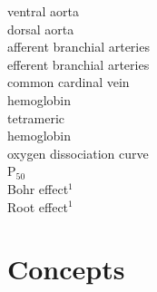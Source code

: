 \documentclass[nofonts, letterpaper]{tufte-handout}
\begin{document}
\begin{multicols}{2}
ventral aorta \\
dorsal aorta \\
afferent branchial arteries \\
efferent branchial arteries \\
common cardinal vein \\
hemoglobin \\
tetrameric \\ \hspace{2ex}hemoglobin \\
oxygen dissociation curve \\
P$_{50}$ \\
Bohr effect$^1$ \\
Root effect$^1$
\end{multicols}

\section{Concepts}
\end{document}
